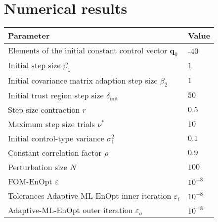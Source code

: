 \section{Numerical results}

\begin{tabular}{ll}
\hline
Parameter & Value\\
\hline
Elements of the initial constant control vector $\mathbf{q}_0$ & -40\\
Initial step size $\beta_1$ & $1$\\
Initial covariance matrix adaption step size $\beta_2$ & $1$\\
Initial trust region step size $\delta_\mathrm{init}$ & $50$\\
Step size contraction $r$ & $0.5$\\
Maximum step size trials $\nu^*$ & $10$\\
Initial control-type variance $\sigma^2_1$ & $0.1$\\
Constant correlation factor $\rho$ & $0.9$\\
Perturbation size $N$ & $100$\\
FOM-EnOpt $\varepsilon$ & $10^{-8}$\\
Tolerances Adaptive-ML-EnOpt inner iteration $\varepsilon_i$ & $10^{-8}$\\
Adaptive-ML-EnOpt outer iteration $\varepsilon_o$ & $10^{-8}$\\
\hline
\end{tabular}

